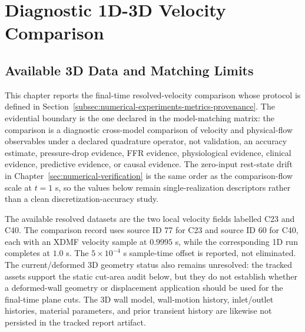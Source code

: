 \section{Diagnostic 1D-3D Velocity Comparison}
\label{sec:resolved-3d-comparison}

\subsection{Available 3D Data and Matching Limits}
\label{subsec:preliminary-cross-model-velocity-comparison}

This chapter reports the final-time resolved-velocity comparison whose protocol
is defined in Section~\ref{subsec:numerical-experiments-metrics-provenance}. The
evidential boundary is the one declared in the model-matching matrix: the
comparison is a diagnostic cross-model comparison of velocity and physical-flow
observables under a declared quadrature operator, not validation, an accuracy
estimate, pressure-drop evidence, FFR evidence, physiological evidence, clinical
evidence, predictive evidence, or causal evidence. The zero-input rest-state
drift in Chapter~\ref{sec:numerical-verification} is the same order as the
comparison-flow scale at $t=1$ s, so the values below remain
single-realization descriptors rather than a clean discretization-accuracy
study.

The available resolved datasets are the two local velocity fields labelled C23
and C40. The comparison record uses source ID 77 for C23 and source ID 60 for
C40, each with an XDMF velocity sample at $0.9995$ s, while the corresponding
1D run completes at $1.0$ s. The $5\times10^{-4}$ s sample-time offset is
reported, not eliminated. The current/deformed 3D geometry status also remains
unresolved: the tracked assets support the static cut-area audit below, but they
do not establish whether a deformed-wall geometry or displacement application
should be used for the final-time plane cuts. The 3D wall model, wall-motion
history, inlet/outlet histories, material parameters, and prior transient
history are likewise not persisted in the tracked report artifact.

